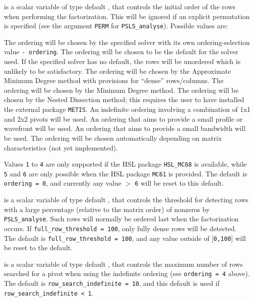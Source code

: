 \documentclass{galahad}
\newcommand{\packagename}{PSLS}
\begin{document}
\begin{description}
 is a scalar variable of type default \integer, that
controls the initial order of the rows when performing the factorization.
This will be ignored if an explicit permutation is specified (see the
argument {\tt PERM} for {\tt \packagename\_analyse}).
Possible values are:
\begin{description}
 The ordering will be chosen by the specified solver with its
        own ordering-selection value {\tt - ordering}.
 The ordering will be chosen to be the default for the solver used.
        If the specified solver has no default, the rows will be unordered
        which is unlikely to be satisfactory.
 The ordering will be chosen by the Approximate Minimum Degree method
       with provisions for ``dense'' rows/columns.
 The ordering will be chosen by the Minimum Degree method.
 The ordering will be chosen by the Nested Dissection method; this
 requires the user to have installed the external package {\tt METIS}.
 An indefinite ordering involving a combination of 1x1 and 2x2 pivots
       will be used.
 An ordering that aims to provide a small profile or wavefront
       will be used.
 An ordering that aims to provide a small bandwidth will be used.
 The ordering will be chosen automatically depending on matrix
       characteristics (not yet implemented).
\end{description}
Values {\tt 1} to {\tt 4} are only supported if the HSL package {\tt HSL\_MC68}
is available, while {\tt 5} and {\tt 6} are only possible
when the HSL package {\tt MC61} is provided.
The default is {\tt ordering = 0}, and currently any value $>$ {\tt 6} will
be reset to this default.

 is a scalar variable of type default \integer,
that controls the threshold for detecting rows with a large percentage
(relative to the matrix order) of nonzeros by {\tt \packagename\_analyse}.
Such rows will normally be ordered last when the factorization occurs.
If {\tt full\_row\_threshold = 100}, only fully dense
rows will be detected.
The default is {\tt full\_row\_threshold = 100},
and any value outside of $[${\tt 0,100}$]$ will be reset to the default.

 is a scalar variable of type default \integer,
that controls the maximum number of rows searched for a pivot when using the
indefinite ordering (see {\tt ordering = 4} above).
The default is {\tt row\_search\_\-indefinite = 10},
and this default is used if {\tt row\_search\_\-indefinite < 1}.


\end{description}
\end{document}

